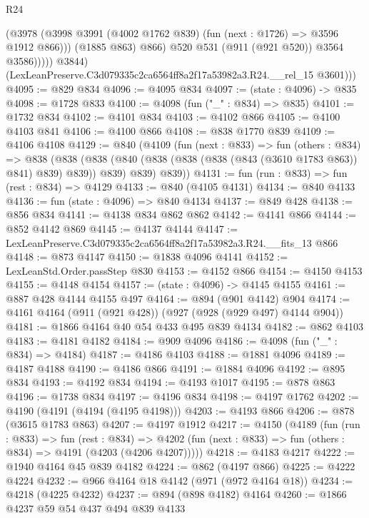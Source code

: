 \begin{lexlean}{R24}
\begin{coremodule}
                      (@3978
                        (@3998 @3991 (@4002 @1762 @839) (fun (next : @1726) => @3596 @1912 @866)))
                      (@1885 @863)
                      @866)
                    @520
                    @531
                    (@911 (@921 @520))
                    @3564
                    @3586)))))
          @3844)
        (LexLeanPreserve.C3d079335c2ca6564ff8a2f17a53982a3.R24.__rel_15 @3601)))
@4095 := @829 @834
@4096 := @4095 @834
@4097 := (state : @4096) -> @835
@4098 := @1728 @833
@4100 := @4098 (fun ("_" : @834) => @835)
@4101 := @1732 @834
@4102 := @4101 @834
@4103 := @4102 @866
@4105 := @4100 @4103 @841
@4106 := @4100 @866
@4108 := @838 @1770 @839
@4109 := @4106 @4108
@4129 := @840
    (@4109
      (fun (next : @833) =>
      fun (others : @834) =>
      @838
        (@838 (@838 (@840 (@838 (@838 (@838 (@843 (@3610 @1783 @863)) @841) @839) @839)) @839) @839)
        @839))
@4131 := fun (run : @833) => fun (rest : @834) => @4129
@4133 := @840 (@4105 @4131)
@4134 := @840 @4133
@4136 := fun (state : @4096) => @840 @4134
@4137 := @849 @428
@4138 := @856 @834
@4141 := @4138 @834 @862 @862
@4142 := @4141 @866
@4144 := @852 @4142 @869
@4145 := @4137 @4144
@4147 := LexLeanPreserve.C3d079335c2ca6564ff8a2f17a53982a3.R24.__fits_13 @866
@4148 := @873 @4147
@4150 := @1838 @4096 @4141
@4152 := LexLeanStd.Order.passStep @830
@4153 := @4152 @866
@4154 := @4150 @4153
@4155 := @4148 @4154
@4157 := (state : @4096) -> @4145 @4155
@4161 := @887 @428 @4144 @4155 @497
@4164 := @894 (@901 @4142) @904
@4174 := @4161 @4164 (@911 (@921 @428)) (@927 (@928 (@929 @497) @4144 @904))
@4181 := @1866 @4164 @40 @54 @433 @495 @839 @4134
@4182 := @862 @4103
@4183 := @4181 @4182
@4184 := @909 @4096
@4186 := @4098 (fun ("_" : @834) => @4184)
@4187 := @4186 @4103
@4188 := @1881 @4096
@4189 := @4187 @4188
@4190 := @4186 @866
@4191 := @1884 @4096
@4192 := @895 @834
@4193 := @4192 @834
@4194 := @4193 @1017
@4195 := @878 @863
@4196 := @1738 @834
@4197 := @4196 @834
@4198 := @4197 @1762
@4202 := @4190 (@4191 (@4194 (@4195 @4198)))
@4203 := @4193 @866
@4206 := @878 (@3615 @1783 @863)
@4207 := @4197 @1912
@4217 := @4150
    (@4189
      (fun (run : @833) =>
      fun (rest : @834) =>
      @4202 (fun (next : @833) => fun (others : @834) => @4191 (@4203 (@4206 @4207)))))
@4218 := @4183 @4217
@4222 := @1940 @4164 @45 @839 @4182
@4224 := @862 (@4197 @866)
@4225 := @4222 @4224
@4232 := @966 @4164 @18 @4142 (@971 (@972 @4164 @18))
@4234 := @4218 (@4225 @4232)
@4237 := @894 (@898 @4182) @4164
@4260 := @1866
    @4237
    @59
    @54
    @437
    @494
    @839
    @4133

\end{coremodule}
\end{lexlean}
